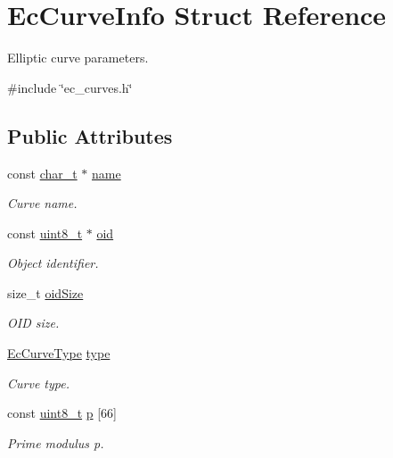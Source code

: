 \hypertarget{structEcCurveInfo}{}\section{Ec\+Curve\+Info Struct Reference}
\label{structEcCurveInfo}


Elliptic curve parameters.  




{\ttfamily \#include \char`\"{}ec\+\_\+curves.\+h\char`\"{}}

\subsection*{Public Attributes}
\begin{DoxyCompactItemize}
\item 
const \hyperlink{compiler__port_8h_a40bb5262bf908c328fbcfbe5d29d0201}{char\+\_\+t} $\ast$ \hyperlink{structEcCurveInfo_a8847f30d2d0c15ae97fe291f1be401f8}{name}
\begin{DoxyCompactList}\small\item\em Curve name. \end{DoxyCompactList}\item 
const \hyperlink{stdint_8h_aba7bc1797add20fe3efdf37ced1182c5}{uint8\+\_\+t} $\ast$ \hyperlink{structEcCurveInfo_a92a5953e46ab92ae71576c79d225d72e}{oid}
\begin{DoxyCompactList}\small\item\em Object identifier. \end{DoxyCompactList}\item 
size\+\_\+t \hyperlink{structEcCurveInfo_aa948a3d595c3de00163f6e4ec47b80a2}{oid\+Size}
\begin{DoxyCompactList}\small\item\em O\+ID size. \end{DoxyCompactList}\item 
\hyperlink{ec__curves_8h_af38fa6633c02444318870a309134ca21}{Ec\+Curve\+Type} \hyperlink{structEcCurveInfo_a66a3a3b5efc82c97fd1f3aaa83d6aed6}{type}
\begin{DoxyCompactList}\small\item\em Curve type. \end{DoxyCompactList}\item 
const \hyperlink{stdint_8h_aba7bc1797add20fe3efdf37ced1182c5}{uint8\+\_\+t} \hyperlink{structEcCurveInfo_adf2630219e7e7fba803e3495da250f63}{p} \mbox{[}66\mbox{]}
\begin{DoxyCompactList}\small\item\em Prime modulus p. \end{DoxyCompactList}\item 

\end{DoxyCompactItemize}

